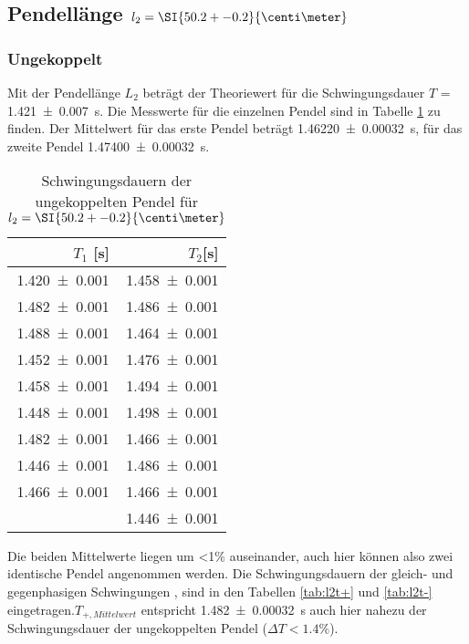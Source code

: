 \subsection{Pendellänge $l_2 = \SI{50.2 +- 0.2}{\centi\meter}$}
\subsubsection{Ungekoppelt}
Mit der Pendellänge $L_2$ beträgt der Theoriewert für die Schwingungsdauer
$T$ = \SI{1.421 +- 0.007}{\second}. Die Messwerte für die einzelnen Pendel
sind in Tabelle \ref{tab:l2ungekoppelt} zu finden.
Der Mittelwert für das erste Pendel beträgt \SI{1.46220+-0.00032}{\second}, für
das zweite Pendel \SI{1.47400+-0.00032}{\second}.
\begin{table}
 \noindent
 \centering
 \caption{Schwingungsdauern der ungekoppelten
 Pendel für $l_2 = \SI{50.2 +- 0.2}{\centi\meter}$}
 \label{tab:l2ungekoppelt}
 \begin{tabular}{rr}
 \toprule
  {$T_1$ [\si{\second}]} & {$T_2$[\si{\second}]} \\
 \midrule
    \num{1.420 +- 0.001} & \num{1.458 +- 0.001} \\
    \num{1.482 +- 0.001} & \num{1.486 +- 0.001}\\
    \num{1.488 +- 0.001} & \num{1.464 +- 0.001}\\
    \num{1.452 +- 0.001} & \num{1.476 +- 0.001}\\
    \num{1.458 +- 0.001} & \num{1.494 +- 0.001}\\
    \num{1.448 +- 0.001} & \num{1.498 +- 0.001}\\
    \num{1.482 +- 0.001} & \num{1.466 +- 0.001}\\
    \num{1.446 +- 0.001} & \num{1.486 +- 0.001}\\
    \num{1.466 +- 0.001} & \num{1.466 +- 0.001}\\
    \num{1.480 +- 0.001] & \num{1.446 +- 0.001}\\
 \bottomrule
 \end{tabular}
\end{table}
Die beiden Mittelwerte liegen um <1\% auseinander, auch hier können also zwei
identische Pendel angenommen werden.
Die Schwingungsdauern der gleich- und gegenphasigen Schwingungen
, sind in den Tabellen \ref{tab:l2t+} und \ref{tab:l2t-}
eingetragen.$T_{+,Mittelwert}$ entspricht
\SI{1.482+-0.00032}{\second} auch hier nahezu der Schwingungsdauer
der ungekoppelten Pendel ($\Delta T < \num{1.4}\%$).
